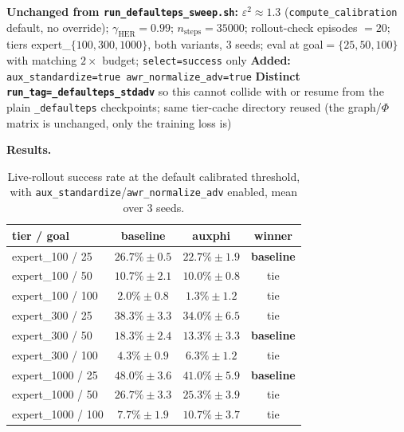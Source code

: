 \documentclass[11pt]{article}
\begin{document}
\begin{algorithm}[H]
\caption{Methodology: identical to \cref{sec:b5-eps99-sweep}'s default-threshold sweep, plus the two flags}
\begin{algorithmic}[1]
\State \textbf{Unchanged from \texttt{run\_defaulteps\_sweep.sh}:} $\varepsilon^2 \approx 1.3$ (\texttt{compute\_calibration} default, no override); $\gamma_{\text{HER}}=0.99$; $n_{\text{steps}}=35000$; rollout-check episodes $=20$; tiers expert\_$\{100,300,1000\}$, both variants, 3 seeds; eval at goal$=\{25,50,100\}$ with matching $2\times$ budget; \texttt{select=success} only
\State \textbf{Added:} \texttt{aux\_standardize=true awr\_normalize\_adv=true}
\State \textbf{Distinct \texttt{run\_tag=\_defaulteps\_stdadv}} so this cannot collide with or resume from the plain \texttt{\_defaulteps} checkpoints; same tier-cache directory reused (the graph/$\Phi$ matrix is unchanged, only the training loss is)
\end{algorithmic}
\end{algorithm}

\textbf{Results.}

\begin{table}[h]
\centering
\small
\caption{Live-rollout success rate at the default calibrated threshold, with \texttt{aux\_standardize}/\texttt{awr\_normalize\_adv} enabled, mean over 3 seeds.}
\begin{tabular}{lccc}
\toprule
tier / goal & baseline & auxphi & winner \\
\midrule
expert\_100 / 25  & $\mathbf{26.7\%} \pm 0.5$ & $22.7\% \pm 1.9$ & \textbf{baseline} \\
expert\_100 / 50  & $10.7\% \pm 2.1$ & $10.0\% \pm 0.8$ & tie \\
expert\_100 / 100 & $2.0\% \pm 0.8$  & $1.3\% \pm 1.2$  & tie \\
\addlinespace
expert\_300 / 25  & $38.3\% \pm 3.3$ & $34.0\% \pm 6.5$ & tie \\
expert\_300 / 50  & $\mathbf{18.3\%} \pm 2.4$ & $13.3\% \pm 3.3$ & \textbf{baseline} \\
expert\_300 / 100 & $4.3\% \pm 0.9$  & $6.3\% \pm 1.2$  & tie \\
\addlinespace
expert\_1000 / 25  & $\mathbf{48.0\%} \pm 3.6$ & $41.0\% \pm 5.9$ & \textbf{baseline} \\
expert\_1000 / 50  & $26.7\% \pm 3.3$ & $25.3\% \pm 3.9$ & tie \\
expert\_1000 / 100 & $7.7\% \pm 1.9$  & $10.7\% \pm 3.7$ & tie \\
\bottomrule
\end{tabular}
\end{table}
\end{document}

